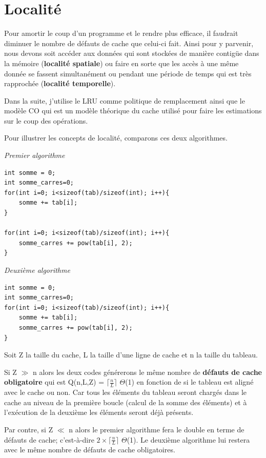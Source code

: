 \documentclass[a4paper]{article}
\begin{document}
\section{Localité}
\label{sec:orgcbcfea2}


Pour amortir le coup d'un programme et le rendre plus efficace, il faudrait diminuer le nombre de défauts de cache que celui-ci fait. Ainsi pour y parvenir, nous devons soit accéder aux données qui sont stockées de manière contigüe dans la mémoire (\textbf{localité spatiale}) ou faire en sorte que les accès à une même donnée se fassent simultanément ou pendant une période de temps qui est très rapprochée (\textbf{localité temporelle}).

Dans la suite, j'utilise le LRU comme politique de remplacement ainsi que le modèle CO qui est un modèle théorique du cache utilisé pour faire les estimations sur le coup des opérations.


Pour illustrer les concepts de localité, comparons ces deux algorithmes.

\emph{Premier algorithme}

\begin{verbatim}
int somme = 0;
int somme_carres=0;
for(int i=0; i<sizeof(tab)/sizeof(int); i++){
    somme += tab[i];
}

for(int i=0; i<sizeof(tab)/sizeof(int); i++){
    somme_carres += pow(tab[i], 2);
}
\end{verbatim}

\emph{Deuxième algorithme}

\begin{verbatim}
int somme = 0;
int somme_carres=0;
for(int i=0; i<sizeof(tab)/sizeof(int); i++){
    somme += tab[i];
    somme_carres += pow(tab[i], 2);
}
\end{verbatim}

Soit Z la taille du cache, L la taille d'une ligne de cache et n la taille du tableau.

Si Z \(\gg\) n alors les deux codes générerons le même nombre de \textbf{défauts de cache obligatoire} qui est Q(n,L,Z) = \(\lceil\frac{n}{L}\rceil\) \textpm{} \(\Theta\)(1) en fonction de si le tableau est aligné avec le cache ou non. Car tous les éléments du tableau seront chargés dans le cache au niveau de la première boucle (calcul de la somme des éléments) et à l'exécution de la deuxième les éléments seront déjà présents.

Par contre, si Z \(\ll\) n alors le premier algorithme fera le double en terme de défauts de cache; c'est-à-dire \(2 \times \lceil\frac{n}{L}\rceil\) \textpm{} \(\Theta\)(1).
Le deuxième algorithme lui restera avec le même nombre de défauts de cache obligatoires.
\end{document}

